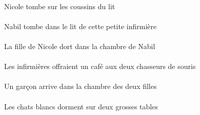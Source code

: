 \begin{exe}
\INDSgAbsP{}   \NicoleBSgAbsP{}    \DEFPlOblP{}    \DEFSgOblP{}   \litDSgOblP{}   \DEP{}   \coussinBPlOblP{}   \SURP{}  \tomberViPrsBSgP{}\\
Nicole tombe sur les coussins du lit
\ex\gll
\INDSgAbs{}   \NabilDSgAbs{}    \DEFSgObl{}    \DEMSgObl{}   \petitASg{}   \infirmiereASgObl{}   \DE{}   \litDSgObl{}   \DANS{}  \tomberViPrsDSg{}\\
\INDSgAbsP{}   \NabilDSgAbsP{}    \DEFSgOblP{}    \DEMSgOblP{}   \petitASgP{}   \infirmiereASgOblP{}   \DEP{}   \litDSgOblP{}   \DANSP{}  \tomberViPrsDSgP{}\\
Nabil tombe dans le lit de cette petite infirmière
\ex\gll
\DEFSgAbs{}    \INDSgObl{}   \NicoleBSgObl{}   \DE{}   \filleCSgAbs{}    \DEFSgObl{}    \INDSgObl{}   \NabilDSgObl{}   \DE{}   \chambreBSgObl{}   \DANS{}  \dormirViPrsCSg{}\\
\DEFSgAbsP{}    \INDSgOblP{}   \NicoleBSgOblP{}   \DEP{}   \filleCSgAbsP{}    \DEFSgOblP{}    \INDSgOblP{}   \NabilDSgOblP{}   \DEP{}   \chambreBSgOblP{}   \DANSP{}  \dormirViPrsCSgP{}\\
La fille de Nicole dort dans la chambre de Nabil
\ex\gll
\DEFPlErg{}   \infirmiereAPlErg{}    \DEFDuDat{}    \INDPlObl{}   \sourisBPlObl{}   \DE{}   \chasseurCDuDat{}   \INDSgAbs{}   \cafeCSgAbs{}  \offrirVdPstCSg{}\\
\DEFPlErgP{}   \infirmiereAPlErgP{}    \DEFDuDatP{}    \INDPlOblP{}   \sourisBPlOblP{}   \DEP{}   \chasseurCDuDatP{}   \INDSgAbsP{}   \cafeCSgAbsP{}  \offrirVdPstCSgP{}\\
Les infirmières offraient un café aux deux chasseurs de souris
\ex\gll
\INDSgAbs{}   \garconDSgAbs{}    \DEFSgObl{}    \DEFDuObl{}   \filleCDuObl{}   \DE{}   \chambreBSgObl{}   \DANS{}  \arriverViPrsDSg{}\\
\INDSgAbsP{}   \garconDSgAbsP{}    \DEFSgOblP{}    \DEFDuOblP{}   \filleCDuOblP{}   \DEP{}   \chambreBSgOblP{}   \DANSP{}  \arriverViPrsDSgP{}\\
Un garçon arrive dans la chambre des deux filles
\ex\gll
\INDDuObl{}   \grosDDu{}   \tableDDuObl{}   \SUR{}   \DEFPlAbs{}   \blancDPl{}   \chatDPlAbs{}  \dormirViPrsDPl{}\\
\INDDuOblP{}   \grosDDuP{}   \tableDDuOblP{}   \SURP{}   \DEFPlAbsP{}   \blancDPlP{}   \chatDPlAbsP{}  \dormirViPrsDPlP{}\\
Les chats blancs dorment sur deux grosses tables
\ex\gll
\INDDuObl{}   \garconDDuObl{}   \AVEC{}   \INDDuAbs{}   \filleCDuAbs{}  \arriverViPrsCDu{}\\
\INDDuOblP{}   \garconDDuOblP{}   \AVECP{}   \INDDuAbsP{}   \filleCDuAbsP{}  \arriverViPrsCDuP{}\\

\end{exe}
